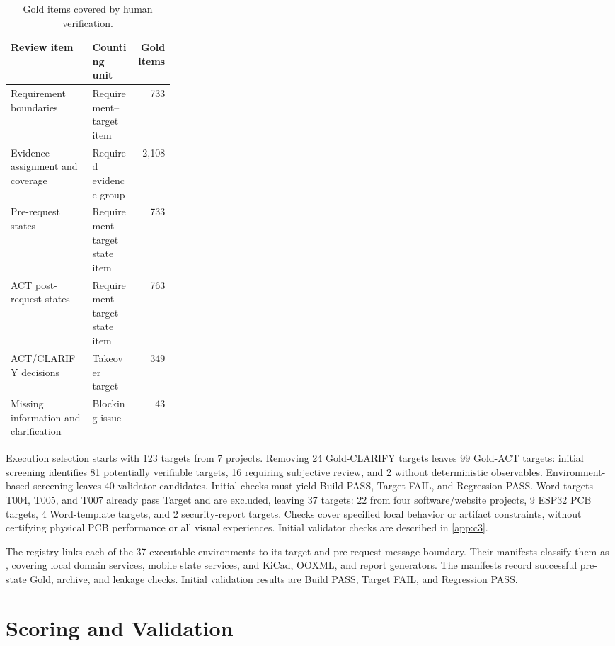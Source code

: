 \documentclass{article} %
\begin{document}
\begin{table}[htbp]
\caption{Gold items covered by human verification.}
\label{tab:human-verification-items}
\centering\normalsize
\setlength{\tabcolsep}{3pt}
\renewcommand{\arraystretch}{1.08}
\begin{tabularx}{\linewidth}{@{}>{\raggedright\arraybackslash}X>{\raggedright\arraybackslash}p{0.27\linewidth}r@{}}
\toprule
Review item & Counting unit & Gold items \\
\midrule
Requirement boundaries & Requirement--target item & 733 \\
Evidence assignment and coverage & Required evidence group & 2,108 \\
Pre-request states & Requirement--target state item & 733 \\
ACT post-request states & Requirement--target state item & 763 \\
ACT/CLARIFY decisions & Takeover target & 349 \\
Missing information and clarification & Blocking issue & 43 \\
\bottomrule
\end{tabularx}
\end{table}

Execution selection starts with 123 targets from 7 projects. Removing 24 Gold-CLARIFY targets leaves 99 Gold-ACT targets: initial screening identifies 81 potentially verifiable targets, 16 requiring subjective review, and 2 without deterministic observables. Environment-based screening leaves 40 validator candidates. Initial checks must yield Build PASS, Target FAIL, and Regression PASS. Word targets T004, T005, and T007 already pass Target and are excluded, leaving 37 targets: 22 from four software/website projects, 9 ESP32 PCB targets, 4 Word-template targets, and 2 security-report targets. Checks cover specified local behavior or artifact constraints, without certifying physical PCB performance or all visual experiences. Initial validator checks are described in \ref{app:c3}.

The registry links each of the 37 executable environments to its target and pre-request message boundary. Their manifests classify them as , covering local domain services, mobile state services, and KiCad, OOXML, and report generators. The manifests record successful pre-state Gold, archive, and leakage checks. Initial validation results are Build PASS, Target FAIL, and Regression PASS.

\FloatBarrier
\section{Scoring and Validation}
\label{app:c}
\end{document}
